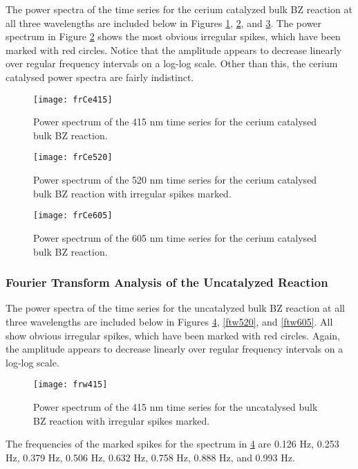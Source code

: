 \documentclass{article}
\begin{document}
The power spectra of the time series for the cerium catalyzed bulk BZ reaction at all three
wavelengths are included below in Figures \ref{ftcat415}, \ref{ftcat520}, and \ref{ftcat605}.
The power spectrum in Figure \ref{ftcat520} shows the most obvious irregular spikes, which
have been marked with red circles. Notice that the amplitude appears to decrease linearly 
over regular frequency intervals on a log-log scale. Other than this, the cerium catalysed
power spectra are fairly indistinct.

\begin{figure}[H]
\texttt{[image: frCe415]}
\centering
\caption{Power spectrum of the 415 nm time series for the cerium catalysed bulk BZ 
reaction.}
\label{ftcat415}
\end{figure}

\begin{figure}[H]
\texttt{[image: frCe520]}
\centering
\caption{Power spectrum of the 520 nm time series for the cerium catalysed bulk BZ 
reaction with irregular spikes marked.}
\label{ftcat520}
\end{figure}

\begin{figure}[H]
\texttt{[image: frCe605]}
\centering
\caption{Power spectrum of the 605 nm time series for the cerium catalysed bulk BZ 
reaction.}
\label{ftcat605}
\end{figure}

\subsubsection{Fourier Transform Analysis of the Uncatalyzed Reaction}

The power spectra of the time series for the uncatalyzed bulk BZ reaction at all three
wavelengths are included below in Figures \ref{ftw415}, \ref{ftw520}, and \ref{ftw605}.
All show obvious irregular spikes, which have been marked with red circles. Again, the 
amplitude appears to decrease linearly over regular frequency intervals on a log-log scale. 

\begin{figure}[H]
\texttt{[image: frw415]}
\centering
\caption{Power spectrum of the 415 nm time series for the uncatalysed bulk BZ 
reaction with irregular spikes marked.}
\label{ftw415}
\end{figure}

The frequencies of the marked spikes for the spectrum in \ref{ftw415} are 0.126 Hz,
0.253 Hz, 0.379 Hz, 0.506 Hz, 0.632 Hz, 0.758 Hz, 0.888 Hz, and 0.993 Hz.
\end{document}
